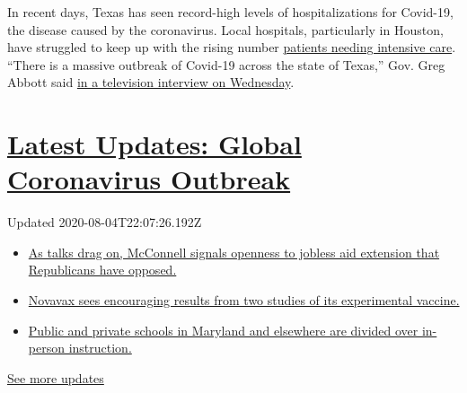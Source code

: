 In recent days, Texas has seen record-high levels of hospitalizations
for Covid-19, the disease caused by the coronavirus. Local hospitals,
particularly in Houston, have struggled to keep up with the rising
number
\href{https://www.texastribune.org/2020/06/23/texas-coronavirus-hospitalizations-icu-houston/}{patients
needing intensive care}. ``There is a massive outbreak of Covid-19
across the state of Texas,'' Gov. Greg Abbott said
\href{https://dfw.cbslocal.com/2020/06/24/gov-greg-abbott-says-texas-massive-covid-19-outbreak}{in
a television interview on Wednesday}.

\hypertarget{latest-updates-global-coronavirus-outbreak}{%
\section{\texorpdfstring{\href{https://www.nytimes3xbfgragh.onion/2020/08/04/world/coronavirus-cases.html?action=click\&pgtype=Article\&state=default\&region=MAIN_CONTENT_1\&context=storylines_live_updates}{Latest
Updates: Global Coronavirus
Outbreak}}{Latest Updates: Global Coronavirus Outbreak}}\label{latest-updates-global-coronavirus-outbreak}}

Updated 2020-08-04T22:07:26.192Z

\begin{itemize}
\tightlist
\item
  \href{https://www.nytimes3xbfgragh.onion/2020/08/04/world/coronavirus-cases.html?action=click\&pgtype=Article\&state=default\&region=MAIN_CONTENT_1\&context=storylines_live_updates\#link-2daa96b5}{As
  talks drag on, McConnell signals openness to jobless aid extension
  that Republicans have opposed.}
\item
  \href{https://www.nytimes3xbfgragh.onion/2020/08/04/world/coronavirus-cases.html?action=click\&pgtype=Article\&state=default\&region=MAIN_CONTENT_1\&context=storylines_live_updates\#link-1228a480}{Novavax
  sees encouraging results from two studies of its experimental
  vaccine.}
\item
  \href{https://www.nytimes3xbfgragh.onion/2020/08/04/world/coronavirus-cases.html?action=click\&pgtype=Article\&state=default\&region=MAIN_CONTENT_1\&context=storylines_live_updates\#link-4825b93}{Public
  and private schools in Maryland and elsewhere are divided over
  in-person instruction.}
\end{itemize}

\href{https://www.nytimes3xbfgragh.onion/2020/08/04/world/coronavirus-cases.html?action=click\&pgtype=Article\&state=default\&region=MAIN_CONTENT_1\&context=storylines_live_updates}{See
more updates}

